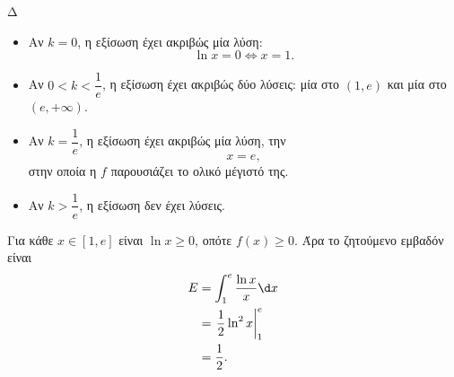 \begin{thema}{Δ}
\begin{erwthma}
\begin{itemize}
\item Αν $k=0$, η εξίσωση έχει ακριβώς μία λύση:
\[
\ln x=0\Leftrightarrow {x=1}.
\]

\item Αν $0<k<\dfrac{1}{e}$, η εξίσωση έχει ακριβώς δύο λύσεις: μία στο $(1,e)$ και μία στο $(e,+\infty)$.

\item Αν $k=\dfrac{1}{e}$, η εξίσωση έχει ακριβώς μία λύση, την
\[
{x=e},
\]
στην οποία η $f$ παρουσιάζει το ολικό μέγιστό της.

\item Αν $k>\dfrac{1}{e}$, η εξίσωση δεν έχει λύσεις.
\end{itemize}

\item Για κάθε $x\in[1,e]$ είναι $\ln x\geq0$, οπότε $f(x)\geq0$. Άρα το ζητούμενο εμβαδόν είναι
\begin{align*}
E
&=\int_1^e\frac{\ln x}{x}\d x\\
&=\left.\frac{1}{2}\ln^2x\right|_{1}^{e}\\
&={\frac{1}{2}}.
\end{align*}
\end{erwthma}
\end{thema}


